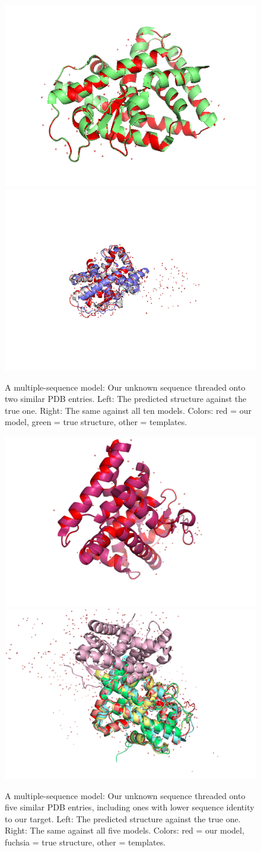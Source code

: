 \documentclass[]{report}   %
\begin{document}
\begin{figure}[h!]
 \begin{center}
  \includegraphics[width=0.45\linewidth]{2_templates_truth.png}
  \includegraphics[width=0.45\linewidth]{2_templates.png}
  \caption{A multiple-sequence model: Our unknown sequence threaded onto two similar PDB entries. Left: The predicted structure against the true one. Right: The same against all ten models. Colors: red = our model, green = true structure, other = templates.}
  \label{fig:tt_2}
 \end{center}
\end{figure}


\begin{figure}[h!]
 \begin{center}
  \includegraphics[width=0.45\linewidth]{5_templates_truth.png}
  \includegraphics[width=0.45\linewidth]{5_templates.png}
  \caption{A multiple-sequence model: Our unknown sequence threaded onto five similar PDB entries, including ones with lower sequence identity to our target. Left: The predicted structure against the true one. Right: The same against all five models. Colors: red = our model, fuchsia = true structure, other = templates.}
  \label{fig:tt_5}
 \end{center}
\end{figure}
\end{document}
